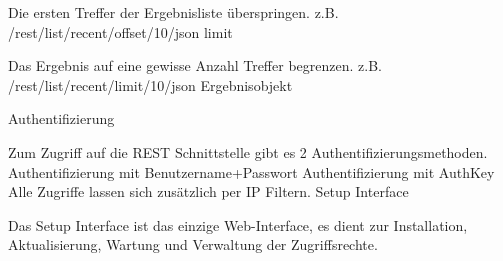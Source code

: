 Die ersten Treffer der Ergebnisliste überspringen.
z.B. /rest/list/recent/offset/10/json
limit

Das Ergebnis auf eine gewisse Anzahl Treffer begrenzen.
z.B. /rest/list/recent/limit/10/json
Ergebnisobjekt

Authentifizierung

Zum Zugriff auf die REST Schnittstelle gibt es 2 Authentifizierungsmethoden.
Authentifizierung mit Benutzername+Passwort
Authentifizierung mit AuthKey
Alle Zugriffe lassen sich zusätzlich per IP Filtern.
Setup Interface

Das Setup Interface ist das einzige Web-Interface, es dient zur Installation, Aktualisierung, Wartung und Verwaltung der Zugriffsrechte.

